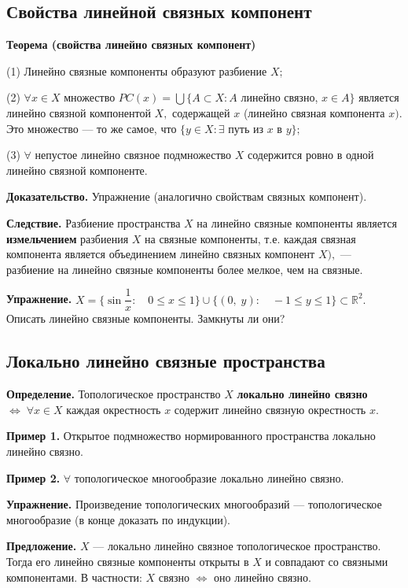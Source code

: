 \documentclass[12pt,a4paper]{article}
\begin{document}
\subsection{Свойства линейной связных компонент}

\textbf{Теорема (свойства линейно связных компонент)}

(1) Линейно связные компоненты образуют разбиение $X;$

(2) $\forall x \in X$ множество $PC(x) = \bigcup\{A \subset X\!: A$ линейно связно, $x \in A\}$ является линейно связной компонентой $X,$ содержащей $x$ (линейно связная компонента $x).$ Это множество --- то же самое, что $\{y \in X\!: \exists$ путь из $x$ в $y\};$

(3) $\forall$ непустое линейно связное подмножество $X$ содержится ровно в одной линейно связной компоненте. 

\textbf{Доказательство.} Упражнение (аналогично свойствам связных компонент).

\textbf{Следствие.} Разбиение пространства $X$ на линейно связные компоненты является \textbf{измельчением} разбиения $X$ на связные компоненты, т.е. каждая связная компонента является объединением линейно связных компонент $X),$ --- разбиение на линейно связные компоненты более мелкое, чем на связные.

\textbf{Упражнение.} $X = \{\sin\dfrac{1}{x}\!\!: \quad 0 \leq x \leq 1\} \cup \{(0, \; y)\!\!: \quad -1 \leq y \leq 1\} \subset \mathbb{R}^{2}.$ Описать линейно связные компоненты. Замкнуты ли они?

\subsection{Локально линейно связные пространства}

\textbf{Определение.} Топологическое пространство $X$ \textbf{локально линейно связно} $\Leftrightarrow \; \forall x \in X$ каждая окрестность $x$ содержит линейно связную окрестность $x.$

\textbf{Пример 1.} Открытое подмножество нормированного пространства локально линейно связно.

\textbf{Пример 2.} $\forall$ топологическое многообразие локально линейно связно. 

\textbf{Упражнение.} Произведение топологических многообразий --- топологическое многообразие (в конце доказать по индукции).

\textbf{Предложение.} $X$ --- локально линейно связное топологическое пространство. Тогда его линейно связные компоненты открыты в $X$ и совпадают со связными компонентами. В частности: $X$ связно $\Leftrightarrow$ оно линейно связно.
\end{document}

